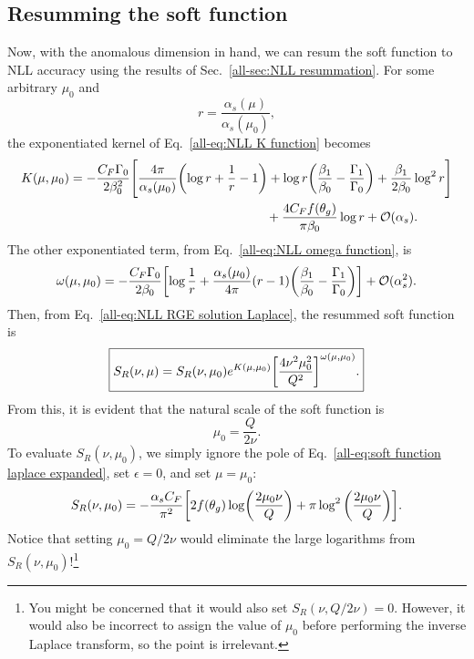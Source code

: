 \documentclass[../thesis.tex]{subfiles}
\providecommand{\cO}{\mathcal{O}}
\begin{document}
\subsection{Resumming the soft function}
	Now, with the anomalous dimension in hand, we can resum the soft function to NLL accuracy using the results of Sec.~\ref{all-sec:NLL resummation}. For some arbitrary $\mu_0$ and
	\begin{equation}
		r = \frac{\alpha_s (\mu)}{\alpha_s (\mu_0)},
	\end{equation}
	the exponentiated kernel of Eq.~\ref{all-eq:NLL K function} becomes
	\begin{equation}
	\begin{aligned}
		K(\mu, \mu_0) = -\frac{C_F \Gamma_0}{2\beta_0^2}\Bigg[\frac{4\pi}{\alpha_s(\mu_0)} \qty(\log r + \frac{1}{r} - 1) + \log r \qty(\frac{\beta_1}{\beta_0} - \frac{\Gamma_1}{\Gamma_0}) &+ \frac{\beta_1}{2\beta_0}\log^2 r \Bigg] \\
		&\hspace{-3cm}+ \frac{4 C_F f(\theta_g)}{\pi \beta_0} \log r + \cO(\alpha_s).
	\end{aligned}
	\end{equation}
	The other exponentiated term, from Eq.~\ref{all-eq:NLL omega function}, is
	\begin{equation}
	\begin{aligned}
		\omega(\mu, \mu_0) = -\frac{C_F \Gamma_0}{2\beta_0}\qty[\log \frac{1}{r} + \frac{\alpha_s(\mu_0)}{4\pi}(r - 1)\qty(\frac{\beta_1}{\beta_0} - \frac{\Gamma_1}{\Gamma_0})] + \cO(\alpha_s^2).
	\end{aligned}
	\end{equation}
	Then, from Eq.~\ref{all-eq:NLL RGE solution Laplace}, the resummed soft function is
	\begin{equation}\label{all-eq:NLL soft function Laplace}
	\boxed{
		S_R(\nu, \mu) = S_R(\nu, \mu_0) e^{K(\mu, \mu_0)} \qty[\frac{4\nu^2\mu_0^2}{Q^2}]^{\omega(\mu, \mu_0)}.
	}
	\end{equation}
	From this, it is evident that the natural scale of the soft function is
	\begin{equation}\label{all-eq:mu0 natural value}
		\mu_0 = \frac{Q}{2\nu}.
	\end{equation}
	To evaluate $S_R(\nu, \mu_0)$, we simply ignore the pole of Eq.~\ref{all-eq:soft function laplace expanded}, set $\epsilon = 0$, and set $\mu = \mu_0$:
	\begin{equation}
		S_R(\nu, \mu_0) = -\frac{\alpha_s C_F}{\pi^2}\qty[2f(\theta_g)\log(\frac{2\mu_0 \nu}{Q}) + \pi \log^2\qty(\frac{2\mu_0 \nu}{Q})].
	\end{equation}
	Notice that setting $\mu_0 = Q/2\nu$ would eliminate the large logarithms from $S_R(\nu, \mu_0)$!\footnote{You might be concerned that it would also set $S_R(\nu, Q/2\nu) = 0$. However, it would also be incorrect to assign the value of $\mu_0$ before performing the inverse Laplace transform, so the point is irrelevant.}
\end{document}

